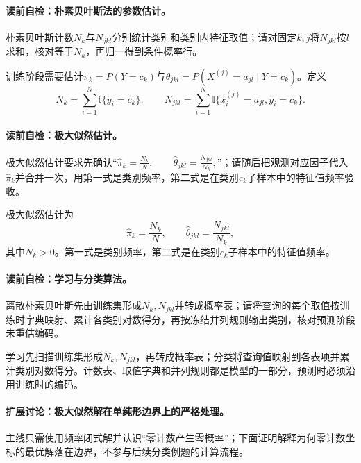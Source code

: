 \paragraph{读前自检：朴素贝叶斯法的参数估计。}朴素贝叶斯计数$N_k$与$N_{jkl}$分别统计类别和类别内特征取值；请对固定$k,j$将$N_{jkl}$按$l$求和，核对等于$N_k$，再归一得到条件概率行。\par

训练阶段需要估计$\pi_k=P(Y=c_k)$与$\theta_{jkl}=P(X^{(j)}=a_{jl}\mid Y=c_k)$。定义
\[
N_k=\sum_{i=1}^{N}\mathbb I\{y_i=c_k\},\qquad
N_{jkl}=\sum_{i=1}^{N}\mathbb I\{x_i^{(j)}=a_{jl},y_i=c_k\}.
\]

\paragraph{读前自检：极大似然估计。}极大似然估计要求先确认“$\widehat\pi_k=\frac{N_k}{N},\qquad \widehat\theta_{jkl}=\frac{N_{jkl}}{N_k},$”；请随后把观测对应因子代入$\widehat\pi_k$并合并一次，用第一式是类别频率，第二式是在类别$c_k$子样本中的特征值频率验收。\par

极大似然估计为
\[
\widehat\pi_k=\frac{N_k}{N},\qquad
\widehat\theta_{jkl}=\frac{N_{jkl}}{N_k},
\]
其中$N_k>0$。第一式是类别频率，第二式是在类别$c_k$子样本中的特征值频率。

\paragraph{读前自检：学习与分类算法。}离散朴素贝叶斯先由训练集形成$N_k,N_{jkl}$并转成概率表；请将查询的每个取值按训练时字典映射、累计各类别对数得分，再按冻结并列规则输出类别，核对预测阶段未重估编码。\par

学习先扫描训练集形成$N_k,N_{jkl}$，再转成概率表；分类将查询值映射到各表项并累计类别对数得分。计数表、取值字典和并列规则都是模型的一部分，预测时必须沿用训练时的编码。

\paragraph{扩展讨论：极大似然解在单纯形边界上的严格处理。}
主线只需使用频率闭式解并认识“零计数产生零概率”；下面证明解释为何零计数坐标的最优解落在边界，不参与后续分类例题的计算流程。

